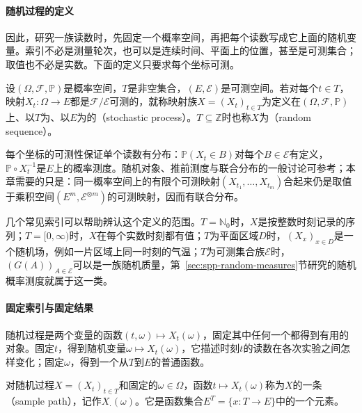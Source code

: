 \paragraph{随机过程的定义}
因此，研究一族读数时，先固定一个概率空间，再把每个读数写成它上面的随机变量。索引不必是测量轮次，也可以是连续时间、平面上的位置，甚至是可测集合；取值也不必是实数。下面的定义只要求每个坐标可测。

\begin{definition}[随机过程]
\label{def:spp-process}
设$(\Omega,\mathcal F,\mathbb P)$是概率空间，$T$是非空集合，$(E,\mathcal E)$是可测空间。若对每个$t\in T$，映射$X_t:\Omega\to E$都是$\mathcal F/\mathcal E$可测的，就称映射族$X=(X_t)_{t\in T}$为定义在$(\Omega,\mathcal F,\mathbb P)$上、以$T$为、以$E$为的（stochastic process）。$T\subseteq\mathbb Z$时也称$X$为（random sequence）。
\end{definition}

每个坐标的可测性保证单个读数有分布：$\mathbb P(X_t\in B)$对每个$B\in\mathcal E$有定义，$\mathbb P\circ X_t^{-1}$是$E$上的概率测度。随机对象、推前测度与联合分布的一般讨论可参考；本章需要的只是：同一概率空间上的有限个可测映射$(X_{t_1},\ldots,X_{t_m})$合起来仍是取值于乘积空间$(E^m,\mathcal E^{\otimes m})$的可测映射，因而有联合分布。

几个常见索引可以帮助辨认这个定义的范围。$T=\mathbb N_0$时，$X$是按整数时刻记录的序列；$T=[0,\infty)$时，$X$在每个实数时刻都有值；$T$为平面区域$D$时，$(X_x)_{x\in D}$是一个随机场，例如一片区域上同一时刻的气温；$T$为可测集合族$\mathcal E$时，$(G(A))_{A\in\mathcal E}$可以是一族随机质量，第~\ref{sec:spp-random-measures}节研究的随机概率测度就属于这一类。

\paragraph{固定索引与固定结果}
随机过程是两个变量的函数$(t,\omega)\mapsto X_t(\omega)$，固定其中任何一个都得到有用的对象。固定$t$，得到随机变量$\omega\mapsto X_t(\omega)$，它描述时刻$t$的读数在各次实验之间怎样变化；固定$\omega$，得到一个从$T$到$E$的普通函数。

\begin{definition}[样本路径]
\label{def:spp-sample-path}
对随机过程$X=(X_t)_{t\in T}$和固定的$\omega\in\Omega$，函数$t\mapsto X_t(\omega)$称为$X$的一条（sample path），记作$X_\cdot(\omega)$。它是函数集合$E^T=\{x:T\to E\}$中的一个元素。
\end{definition}

